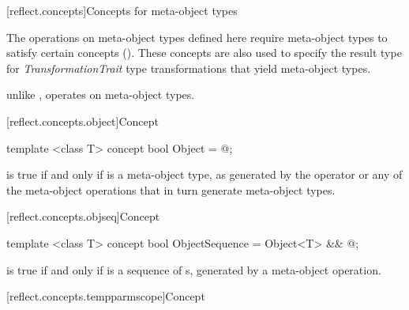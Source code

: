 [reflect.concepts]{Concepts for meta-object types}

\begin{std.txt}\color{addclr}
\pnum
The operations on meta-object types defined here require meta-object types to
satisfy certain concepts (). These concepts are also used to
specify the result type for \emph{TransformationTrait} type transformations that
yield meta-object types.
\begin{note} unlike ,  operates on meta-object types.\end{note}

\end{std.txt}

[reflect.concepts.object]{Concept }

\begin{std.txt}\color{addclr}

\begin{itemdecl}
template <class T> concept bool Object = @\seebelow@;
\end{itemdecl}

\begin{itemdescr}
\pnum
{} is true if and only if  is a meta-object type, as generated by the  operator or any of the meta-object operations that in turn generate meta-object types.

\end{itemdescr}
\end{std.txt}

[reflect.concepts.objseq]{Concept }
\begin{std.txt}\color{addclr}

\begin{itemdecl}
template <class T> concept bool ObjectSequence = Object<T> && @\seebelow@;
\end{itemdecl}

\begin{itemdescr}
\pnum
{} is true if and only if  is a sequence of s, generated by a meta-object operation.

\end{itemdescr}
\end{std.txt}

[reflect.concepts.tempparmscope]{Concept }

